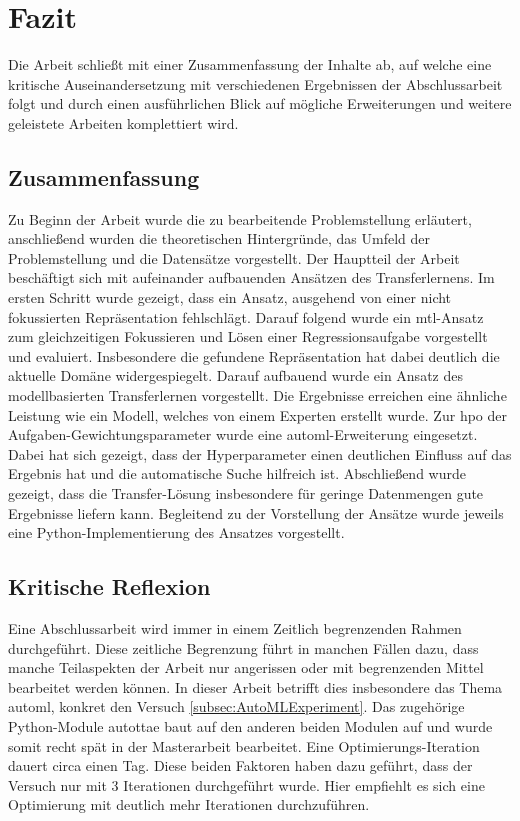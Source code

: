 \chapter{Fazit}
\label{chap:Fazit}
Die Arbeit schließt mit einer Zusammenfassung der Inhalte ab, auf welche eine kritische Auseinandersetzung mit verschiedenen Ergebnissen der Abschlussarbeit folgt und durch einen ausführlichen Blick auf mögliche Erweiterungen und weitere geleistete Arbeiten komplettiert wird.
 
	\section{Zusammenfassung}
	\label{sec:Zusammenfassung}
	Zu Beginn der Arbeit wurde die zu bearbeitende Problemstellung erläutert, anschließend wurden die theoretischen Hintergründe, das Umfeld der Problemstellung und die Datensätze vorgestellt. Der Hauptteil der Arbeit beschäftigt sich mit aufeinander aufbauenden Ansätzen des Transferlernens. Im ersten Schritt wurde gezeigt, dass ein Ansatz, ausgehend von einer nicht fokussierten Repräsentation fehlschlägt. Darauf folgend wurde ein \acl{mtl}-Ansatz zum gleichzeitigen Fokussieren und Lösen einer Regressionsaufgabe vorgestellt und evaluiert. Insbesondere die gefundene Repräsentation hat dabei deutlich die aktuelle Domäne widergespiegelt. Darauf aufbauend wurde ein Ansatz des modellbasierten Transferlernen vorgestellt. Die Ergebnisse erreichen eine ähnliche Leistung wie ein Modell, welches von einem Experten erstellt wurde. Zur \ac{hpo} der Aufgaben-Gewichtungsparameter wurde eine \ac{automl}-Erweiterung eingesetzt. Dabei hat sich gezeigt, dass der Hyperparameter einen deutlichen Einfluss auf das Ergebnis hat und die automatische Suche hilfreich ist. Abschließend wurde gezeigt, dass die Transfer-Lösung insbesondere für geringe Datenmengen gute Ergebnisse liefern kann. Begleitend zu der Vorstellung der Ansätze wurde jeweils eine Python-Implementierung des Ansatzes vorgestellt. 
	
	\section{Kritische Reflexion}
	\label{sec:KritischeReflexion}
	Eine  Abschlussarbeit wird immer in einem Zeitlich begrenzenden Rahmen durchgeführt. Diese zeitliche Begrenzung führt in manchen Fällen dazu, dass manche Teilaspekten der Arbeit nur angerissen oder mit  begrenzenden Mittel bearbeitet werden können. In dieser Arbeit betrifft dies insbesondere das Thema \ac{automl}, konkret den Versuch \ref{subsec:AutoMLExperiment}. Das zugehörige Python-Module \ac{autottae} baut auf den anderen beiden Modulen auf und wurde somit recht spät in der Masterarbeit bearbeitet. Eine Optimierungs-Iteration dauert circa einen Tag. Diese beiden Faktoren haben dazu geführt, dass der Versuch nur mit 3 Iterationen durchgeführt wurde. Hier empfiehlt es sich eine Optimierung mit deutlich mehr Iterationen durchzuführen.
	
